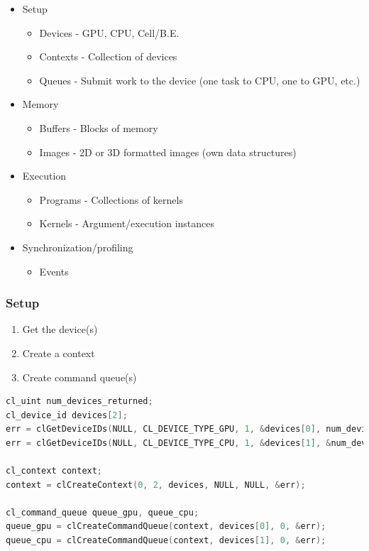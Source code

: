 \begin{itemize}
\tightlist
\item
  Setup

  \begin{itemize}
  \tightlist
  \item
    Devices - GPU, CPU, Cell/B.E.
  \item
    Contexts - Collection of devices
  \item
    Queues - Submit work to the device (one task to CPU, one to GPU,
    etc.)
  \end{itemize}
\item
  Memory

  \begin{itemize}
  \tightlist
  \item
    Buffers - Blocks of memory
  \item
    Images - 2D or 3D formatted images (own data structures)
  \end{itemize}
\item
  Execution

  \begin{itemize}
  \tightlist
  \item
    Programs - Collections of kernels
  \item
    Kernels - Argument/execution instances
  \end{itemize}
\item
  Synchronization/profiling

  \begin{itemize}
  \tightlist
  \item
    Events
  \end{itemize}
\end{itemize}

\hypertarget{setup}{%
\subsubsection{Setup}\label{setup}}

\begin{enumerate}
\def\labelenumi{\arabic{enumi}.}
\tightlist
\item
  Get the device(s)
\item
  Create a context
\item
  Create command queue(s)
\end{enumerate}

\begin{lstlisting}[language=C++]
cl_uint num_devices_returned;
cl_device_id devices[2];
err = clGetDeviceIDs(NULL, CL_DEVICE_TYPE_GPU, 1, &devices[0], num_devices_returned);
err = clGetDeviceIDs(NULL, CL_DEVICE_TYPE_CPU, 1, &devices[1], &num_devices_returned);

cl_context context;
context = clCreateContext(0, 2, devices, NULL, NULL, &err);

cl_command_queue queue_gpu, queue_cpu;
queue_gpu = clCreateCommandQueue(context, devices[0], 0, &err);
queue_cpu = clCreateCommandQueue(context, devices[1], 0, &err);
\end{lstlisting}

